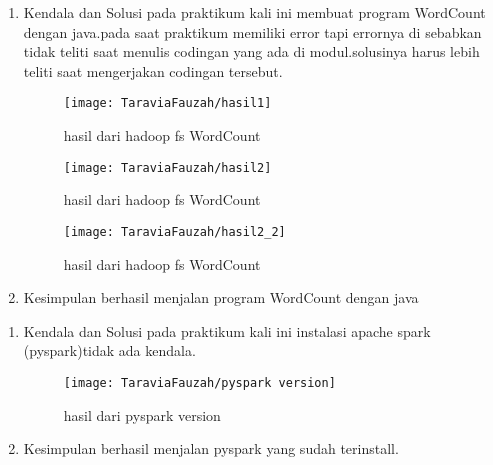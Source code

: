 \begin{enumerate}
\item Kendala dan Solusi
\newline pada praktikum kali ini membuat program WordCount dengan java.pada saat praktikum memiliki error tapi errornya di sebabkan tidak teliti saat menulis codingan yang ada di modul.solusinya harus lebih teliti saat mengerjakan codingan tersebut.

\begin{figure}[!ht]
\texttt{[image: TaraviaFauzah/hasil1]}
\caption{hasil dari hadoop fs WordCount}
\label{gam:perkuliahan2-12}
\end{figure}

\begin{figure}[!ht]
\texttt{[image: TaraviaFauzah/hasil2]}
\caption{hasil dari hadoop fs WordCount}
\label{gam:perkuliahan2-12}
\end{figure}

\begin{figure}[!ht]
\texttt{[image: TaraviaFauzah/hasil2\_2]}
\caption{hasil dari hadoop fs WordCount}
\label{gam:perkuliahan2-12}
\end{figure}

\item Kesimpulan
\newline berhasil menjalan program WordCount dengan java

\end{enumerate}

\begin{enumerate}
\item Kendala dan Solusi
\newline pada praktikum kali ini instalasi apache spark (pyspark)tidak ada kendala.

\begin{figure}[!ht]
\texttt{[image: TaraviaFauzah/pyspark version]}
\caption{hasil dari pyspark version}
\label{gam:perkuliahan2-15}
\end{figure}

\item Kesimpulan
\newline berhasil menjalan pyspark yang sudah terinstall.
\end{enumerate}

